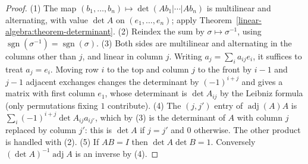 \begin{proof}
(1) The map $(b_1, \ldots, b_n) \mapsto \det(Ab_1 | \cdots | Ab_n)$ is multilinear and alternating, with value
$\det A$ on $(e_1, \ldots, e_n)$; apply Theorem~\ref{linear-algebra:theorem-determinant}.
(2) Reindex the sum by $\sigma \mapsto \sigma^{-1}$, using $\operatorname{sgn}(\sigma^{-1}) = \operatorname{sgn}(\sigma)$.
(3) Both sides are multilinear and alternating in the columns other than $j$, and linear in
column $j$. Writing $a_j = \sum_i a_{ij}e_i$, it suffices to treat $a_j = e_i$. Moving row $i$ to the top and
column $j$ to the front by $i - 1$ and $j - 1$ adjacent exchanges changes the determinant by
$(-1)^{i+j}$ and gives a matrix with first column $e_1$, whose determinant is $\det A_{ij}$ by the
Leibniz formula (only permutations fixing $1$ contribute).
(4) The $(j,j')$ entry of $\operatorname{adj}(A)A$ is $\sum_i (-1)^{i+j}\det A_{ij} a_{ij'}$, which by (3) is the
determinant of $A$ with column $j$ replaced by column $j'$: this is $\det A$ if $j = j'$ and $0$
otherwise. The other product is handled with (2).
(5) If $AB = I$ then $\det A\det B = 1$. Conversely $(\det A)^{-1}\operatorname{adj}A$ is an inverse by (4).
\end{proof}

